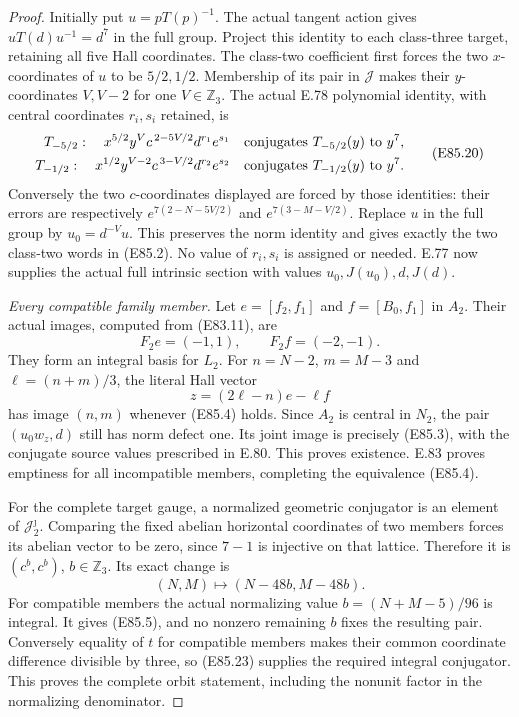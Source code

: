 \begin{proof}
Initially put $u=pT(p)^{-1}$. The actual tangent
action gives $uT(d)u^{-1}=d^7$ in the full
group. Project this identity to each class-three
target, retaining all five Hall coordinates.
The class-two coefficient first forces the two
$x$-coordinates of $u$ to be $5/2,1/2$.
Membership of its pair in $\mathcal J$ makes
their $y$-coordinates $V,V-2$ for one
$V\in\mathbb Z_3$. The actual E.78 polynomial
identity, with central coordinates $r_i,s_i$
retained, is
\[
 \begin{aligned}
 T_{-5/2}:\quad
  x^{5/2}y^Vc^{\,2-5V/2}d^{r_1}e^{s_1}
       &\quad\hbox{conjugates }T_{-5/2}(y)\hbox{ to }y^7,\\
 T_{-1/2}:\quad
  x^{1/2}y^{V-2}c^{\,3-V/2}d^{r_2}e^{s_2}
       &\quad\hbox{conjugates }T_{-1/2}(y)\hbox{ to }y^7.
 \end{aligned}
 \tag{E85.20}
\]
Conversely the two $c$-coordinates displayed
are forced by those identities: their errors
are respectively
$e^{7(2-N-5V/2)}$ and
$e^{7(3-M-V/2)}$.
Replace $u$ in the full group by $u_0=d^{-V}u$.
This preserves the norm identity and gives
exactly the two class-two words in (E85.2).
No value of $r_i,s_i$ is assigned or needed.
E.77 now supplies the actual full intrinsic
section with values $u_0,J(u_0),d,J(d)$.

\emph{Every compatible family member.}
Let $e=[f_2,f_1]$ and $f=[B_0,f_1]$ in $A_2$.
Their actual images, computed from (E83.11), are
\[
                   F_2e=(-1,1),\qquad F_2f=(-2,-1).
 \tag{E85.21}
\]
They form an integral basis for $L_2$. For
$n=N-2$, $m=M-3$ and $\ell=(n+m)/3$, the
literal Hall vector
\[
                        z=(2\ell-n)e-\ell f
 \tag{E85.22}
\]
has image $(n,m)$ whenever (E85.4) holds.
Since $A_2$ is central in $N_2$, the pair
$(u_0w_z,d)$ still has norm defect one. Its
joint image is precisely (E85.3), with the
conjugate source values prescribed in E.80.
This proves existence. E.83 proves emptiness
for all incompatible members, completing the
equivalence (E85.4).

For the complete target gauge, a normalized
geometric conjugator is an element of
$\mathcal J_2^{\jmath}$. Comparing the fixed
abelian horizontal coordinates of two members
forces its abelian vector to be zero, since
$7-1$ is injective on that lattice. Therefore
it is $(c^b,c^b)$, $b\in\mathbb Z_3$.
Its exact change is
\[
                       (N,M)\longmapsto(N-48b,M-48b).
 \tag{E85.23}
\]
For compatible members the actual normalizing
value $b=(N+M-5)/96$ is integral. It gives
(E85.5), and no nonzero remaining $b$ fixes
the resulting pair. Conversely equality of
$t$ for compatible members makes their common
coordinate difference divisible by three,
so (E85.23) supplies the required integral
conjugator. This proves the complete orbit
statement, including the nonunit factor in
the normalizing denominator.


\end{proof}
